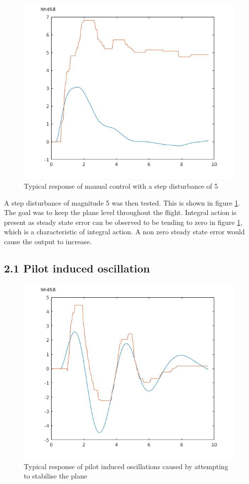 \documentclass[twoside,twocolumn]{article}
\begin{document}
\begin{figure}[h]
  \centering
    \includegraphics[width=\linewidth]{2_step}
  \caption{Typical response of manual control with a step disturbance of 5 }
  \label{fig:2step}
\end{figure}
A step disturbance of magnitude 5 was then tested. This is shown in figure \ref{fig:2step}. The goal was to keep the plane level throughout the flight. Integral action is present as steady state error can be observed to be tending to zero in figure \ref{fig:2step}, which is a characteristic of integral action. A non zero steady state error would cause the output to increase.
\subsection{2.1 Pilot induced oscillation}
 \begin{figure}[h]
  \centering
    \includegraphics[width=\linewidth]{2-1_with_input}
  \caption{Typical response of pilot induced oscillations caused by attempting to stabilise the plane}
  \label{fig:2-1pio}
\end{figure}
\end{document}
